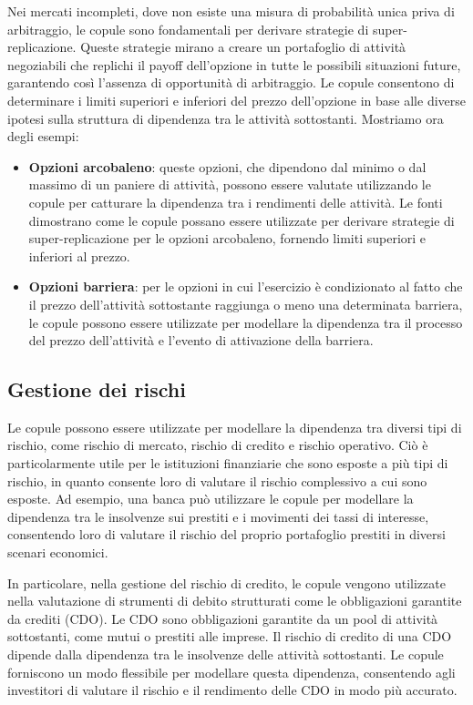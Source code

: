 \documentclass[%
	corpo=11pt,
    twoside,
    stile=classica,
    oldstyle,
    tipotesi=custom,
    greek,
    evenboxes,
]{toptesi}
\begin{document}
Nei mercati incompleti, dove non esiste una misura di probabilità unica priva di arbitraggio, le copule sono fondamentali per derivare strategie di super-replicazione. Queste strategie mirano a creare un portafoglio di attività negoziabili che replichi il payoff dell’opzione in tutte le possibili situazioni future, garantendo così l’assenza di opportunità di arbitraggio. Le copule consentono di determinare i limiti superiori e inferiori del prezzo dell’opzione in base alle diverse ipotesi sulla struttura di dipendenza tra le attività sottostanti. Mostriamo ora degli esempi:

\begin{itemize}
	\item \textbf{Opzioni arcobaleno}: queste opzioni, che dipendono dal minimo o dal massimo di un paniere di attività, possono essere valutate utilizzando le copule per catturare la dipendenza tra i rendimenti delle attività. Le fonti dimostrano come le copule possano essere utilizzate per derivare strategie di super-replicazione per le opzioni arcobaleno, fornendo limiti superiori e inferiori al prezzo.
	
	\item \textbf{Opzioni barriera}: per le opzioni in cui l’esercizio è condizionato al fatto che il prezzo dell’attività sottostante raggiunga o meno una determinata barriera, le copule possono essere utilizzate per modellare la dipendenza tra il processo del prezzo dell’attività e l’evento di attivazione della barriera.
\end{itemize}

\subsection{Gestione dei rischi}
Le copule possono essere utilizzate per modellare la dipendenza tra diversi tipi di rischio, come rischio di mercato, rischio di credito e rischio operativo. Ciò è particolarmente utile per le istituzioni finanziarie che sono esposte a più tipi di rischio, in quanto consente loro di valutare il rischio complessivo a cui sono esposte. Ad esempio, una banca può utilizzare le copule per modellare la dipendenza tra le insolvenze sui prestiti e i movimenti dei tassi di interesse, consentendo loro di valutare il rischio del proprio portafoglio prestiti in diversi scenari economici.

In particolare, nella gestione del rischio di credito, le copule vengono utilizzate nella valutazione di strumenti di debito strutturati come le obbligazioni garantite da crediti (CDO). Le CDO sono obbligazioni garantite da un pool di attività sottostanti, come mutui o prestiti alle imprese. Il rischio di credito di una CDO dipende dalla dipendenza tra le insolvenze delle attività sottostanti. Le copule forniscono un modo flessibile per modellare questa dipendenza, consentendo agli investitori di valutare il rischio e il rendimento delle CDO in modo più accurato.
\end{document}
